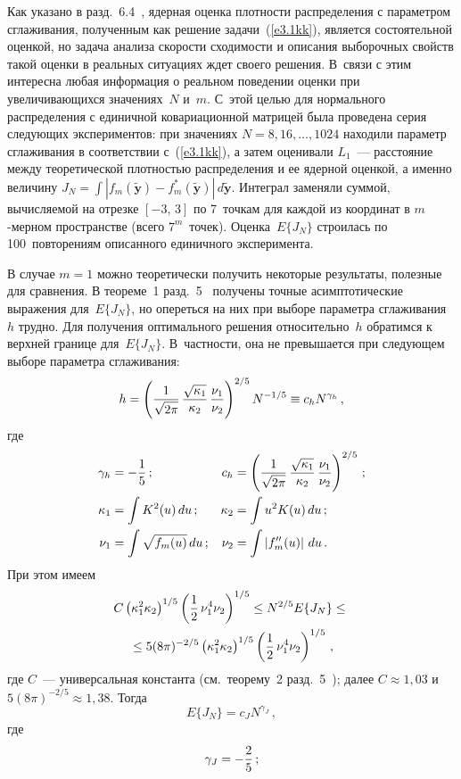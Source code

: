 \begin{multicols}{2}
      Как указано в разд.~6.4~\cite{2kk}, ядерная оценка плотности распределения с параметром 
сглаживания, полученным как решение задачи~(\ref{e3.1kk}), является состоятельной оценкой, но 
задача анализа скорости сходимости и описания выборочных свойств такой оценки в реальных 
ситуациях ждет своего решения. В~связи с этим интересна любая информация о реальном 
поведении оценки при увеличивающихся значениях~$N$ и~$m$. С~этой целью для нормального 
распределения с единичной ковариационной мат\-ри\-цей была проведена серия следующих 
экспериментов: при значениях $N = 8, 16, \ldots , 1024$ находили параметр 
сглаживания в соответствии с~(\ref{e3.1kk}), а затем оценивали $L_1$~--- расстояние между 
теоретической плотностью распределения и ее ядерной оценкой, а именно величину
      $J_N =\int\left\vert f_m(\widetilde{\mathbf{y}})-
f_m^*(\widetilde{\mathbf{y}})\right\vert\,d\widetilde{\mathbf{y}}$.
Интеграл заменяли суммой, вычисляемой на отрезке $[-3,\,3]$ по 7~точкам для каждой из 
координат в $m$-мерном пространстве (всего $7^m$~точек). Оценка~$E\{J_N\}$ строилась по 
100~повторениям описанного единичного эксперимента. 

      В случае $m=1$ можно теоретически получить некоторые результаты, полезные для 
сравнения. В теореме~1 разд.~5~\cite{2kk} получены точные асимптотические выражения 
для~$E\{J_N\}$, но опереться на них при выборе параметра сглаживания~$h$ трудно. Для 
получения оптимального решения относительно~$h$ обратимся к верхней границе 
для~$E\{J_N\}$. В~частности, она не превышается при следующем выборе параметра 
сглаживания:
      \begin{equation}
      h=\left( \displaystyle\frac{\displaystyle 1\mathstrut}{\displaystyle \sqrt{2\pi}\mathstrut}\,\displaystyle\frac{\displaystyle \sqrt{\kappa_1}\mathstrut}{\displaystyle \kappa_2\mathstrut}\,\displaystyle\frac{\displaystyle \nu_1\mathstrut}{\displaystyle \nu_2\mathstrut}\right )^{2/5} 
N^{-1/5}\equiv c_h N^{\gamma_h}\,,
      \label{e3.5kk}
      \end{equation}
где 
\begin{align*}
\gamma_h &= -\displaystyle\frac{\displaystyle 1\mathstrut}{\displaystyle 5\mathstrut}\,; & c_h &=\left ( 
\displaystyle\frac{\displaystyle 1\mathstrut}{\displaystyle \sqrt{2\pi}\mathstrut}\,\displaystyle\frac{\displaystyle \sqrt{\kappa_1}\mathstrut}{\displaystyle \kappa_2\mathstrut}\,\displaystyle\frac{\displaystyle \nu_1\mathstrut}{\displaystyle \nu_2\mathstrut}\right )^{2/5}\,;\\
\kappa_1 &= \int K^2(u)\,du\,; & \kappa_2&=\int u^2K(u)\,du\,;\\
\nu_1 &=\int\sqrt{f_m(u)}\,du\,; & \nu_2 &=\int\left\vert f_m^{\prime\prime}(u)\right\vert\,du\,.\\
\end{align*}
При этом имеем
\begin{multline*}
C\left( \kappa_1^2\kappa_2\right)^{1/5}\left(\displaystyle\frac{\displaystyle 1\mathstrut}{\displaystyle 2\mathstrut}\,\nu_1^4\nu_2\right)^{1/5}\leq 
N^{2/5}E\{J_N\}\leq {}\\
{}\leq 5(8\pi)^{-2/5}\left( 
\kappa_1^2\kappa_2\right)^{1/5}\left(\displaystyle\frac{\displaystyle 1\mathstrut}{\displaystyle 2\mathstrut}\,\nu_1^4\nu_2\right)^{1/5}\,,
\end{multline*}
где $C$~--- универсальная константа (см.\ теорему~2 разд.~5~\cite{2kk}); далее $C\approx 1{,}03$ 
и $5(8\pi)^{-2/5}\approx 1{,}38$. Тогда 
\begin{equation}
E\{J_N\} =c_J N^{\gamma_J}\,,
\label{e3.6kk}
\end{equation}
где 
$$
\gamma_J =-\displaystyle\frac{\displaystyle 2\mathstrut}{\displaystyle 5\mathstrut}\,;
$$


\end{multicols}
